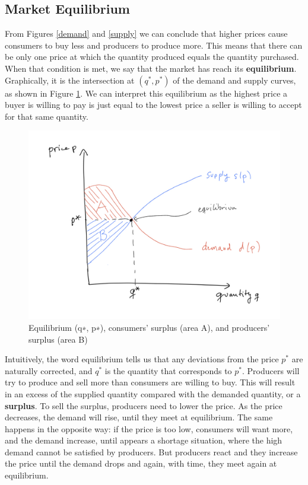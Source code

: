 \documentclass[11pt, letterpaper]{article}
\begin{document}
\subsection{Market Equilibrium}

From Figures \ref{demand} and \ref{supply} we can conclude that higher prices cause consumers to buy less and producers to produce more. This means that there can be only one price at which the quantity produced equals the quantity purchased. When that condition is met, we say that the market has reach its \textbf{equilibrium}.  Graphically, it is the intersection at $(q^{\ast},p^{\ast})$ of the demand and supply curves, as shown in Figure \ref{equi}.  We can interpret this equilibrium as the highest price a buyer is willing to pay is just equal to the lowest price a seller is willing to accept for that same quantity.

 \begin{figure}[ht!]
  \includegraphics[width=\textwidth]{Informe/equilibrium.jpeg}
 \caption{Equilibrium (q∗, p∗), consumers’ surplus (area A), and producers’ surplus (area B)}
 \label{equi}
\end{figure}

Intuitively, the word equilibrium tells us that any deviations from the price $p^{\ast}$ are naturally corrected, and $q^{\ast}$ is the quantity that corresponds to $p^{\ast}$. Producers will try to produce and sell more than consumers are willing to buy. This will result in an excess of the supplied quantity compared with the demanded quantity, or a \textbf{surplus}. To sell the surplus, producers need to lower the price. As the price decreases, the demand will rise, until they meet at equilibrium. The same happens in the opposite way: if the price is too low, consumers will want more, and the demand increase, until appears a shortage situation, where the high demand cannot be satisfied by producers. But producers react and they increase the price until the demand drops and again, with time, they meet again at equilibrium.
\end{document}
